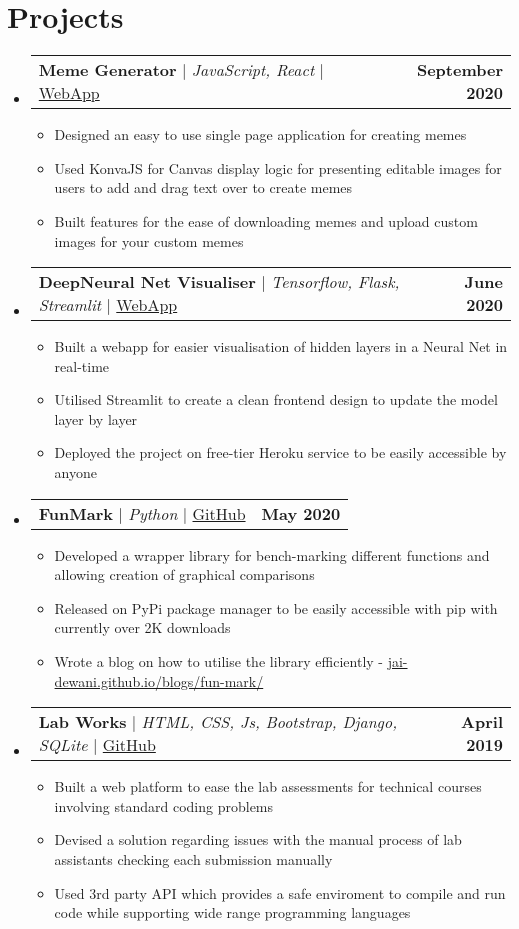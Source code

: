 \documentclass[letterpaper,11pt]{article}
\makeatletter
\newcommand{\resumeItem}[1]{
  \item\small{
    {#1 \vspace{-2pt}}
  }
}
\newcommand{\resumeProjectHeading}[2]{
    \item
    \begin{tabular*}{1.001\textwidth}{l@{\extracolsep{\fill}}r}
      \small#1 & \textbf{\small #2} \\
    \end{tabular*}\vspace{-7pt}
}
\newcommand{\resumeSubHeadingListStart}{\begin{itemize}[leftmargin=0.0in, label={}]}
\newcommand{\resumeSubHeadingListEnd}{\end{itemize}}
\newcommand{\resumeItemListStart}{\justify \begin{itemize}}
\newcommand{\resumeItemListEnd}{\end{itemize}\vspace{-2pt}}
\makeatother
\begin{document}
\section{Projects}
    \vspace{-5pt}
    \resumeSubHeadingListStart
        \resumeProjectHeading
            {\textbf{Meme Generator} $|$ \emph{JavaScript, React}  $|$ \href{https://jai-dewani.github.io/Meme-App/}{WebApp}}{September 2020}
            \resumeItemListStart
                \resumeItem{Designed an easy to use single page application for creating memes}
                \resumeItem{Used KonvaJS for Canvas display logic for presenting editable images for users to add and drag text over to create memes}
                \resumeItem{Built features for the ease of downloading memes and upload custom images for your custom memes}
            \resumeItemListEnd
        \resumeProjectHeading
            {\textbf{DeepNeural Net Visualiser} $|$ \emph{Tensorflow, Flask, Streamlit} $|$ \href{https://visualize-neural-network.herokuapp.com/}{WebApp}}{June 2020} 
            \resumeItemListStart
                \resumeItem{Built a webapp for easier visualisation of hidden layers in a Neural Net in real-time}
                \resumeItem{Utilised Streamlit to create a clean frontend design to update the model layer by layer}
                \resumeItem{Deployed the project on free-tier Heroku service to be easily accessible by anyone}
            \resumeItemListEnd 
        \resumeProjectHeading
            {\textbf{FunMark} $|$ \emph{Python} $|$ \href{https://github.com/jai-dewani/fun-mark}{GitHub}}{May 2020} 
            \resumeItemListStart
                \resumeItem{Developed a wrapper library for bench-marking different functions and allowing creation of graphical comparisons}
                \resumeItem{Released on PyPi package manager to be easily accessible with pip with currently over 2K downloads}
                \resumeItem{Wrote a blog on how to utilise the library efficiently -  \href{https://jai-dewani.github.io/blogs/fun-mark/}{jai-dewani.github.io/blogs/fun-mark/}}
            \resumeItemListEnd 
        \resumeProjectHeading
            {\textbf{Lab Works} $|$ \emph{HTML, CSS, Js, Bootstrap, Django, SQLite} $|$ \href{https://github.com/jai-dewani/Lab-Works}{GitHub}}{April 2019} 
            \resumeItemListStart
                \resumeItem{Built a web platform to ease the lab assessments for technical courses involving standard coding problems }
                \resumeItem{Devised a solution regarding issues with the manual process of lab assistants checking each submission manually}
                \resumeItem{Used 3rd party API which provides a safe enviroment to compile and run code while supporting wide range programming languages}
            \resumeItemListEnd 
    \resumeSubHeadingListEnd
\end{document}
